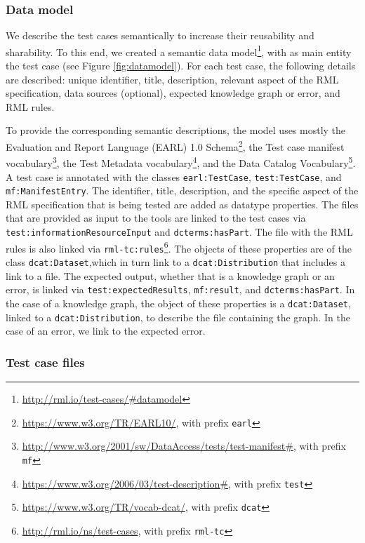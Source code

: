 \subsubsection{Data model}

We describe the test cases semantically to increase their reusability and sharability. To this end, we created a semantic data model\footnote{\url{http://rml.io/test-cases/\#datamodel}}, with as main entity the test case (see Figure \ref{fig:datamodel}). For each test case, the following details are described: unique identifier, title, description, relevant aspect of the RML specification, data sources (optional), expected knowledge graph or error, and RML rules.

To provide the corresponding semantic descriptions, the model uses mostly the Evaluation and Report Language (EARL) 1.0 Schema\footnote{\url{https://www.w3.org/TR/EARL10/}, with prefix \texttt{earl}}, the Test case manifest vocabulary\footnote{\url{http://www.w3.org/2001/sw/DataAccess/tests/test-manifest\#}, with prefix \texttt{mf}}, the Test Metadata vocabulary\footnote{\url{https://www.w3.org/2006/03/test-description\#}, with prefix \texttt{test}}, and the Data Catalog Vocabulary\footnote{\url{https://www.w3.org/TR/vocab-dcat/}, with prefix \texttt{dcat}}. A test case is annotated with the classes \verb|earl:TestCase|, \verb|test:TestCase|, and \verb|mf:ManifestEntry|. The identifier, title, description, and the specific aspect of the RML specification that is being tested are added as datatype properties. The files that are provided as input to the tools are linked to the test cases via \verb|test:informationResourceInput| and \verb|dcterms:hasPart|. The file with the RML rules is also linked via \verb|rml-tc:rules|\footnote{\url{http://rml.io/ns/test-cases}, with prefix \texttt{rml-tc}}. The objects of these properties are of the class \verb|dcat:Dataset|,which in turn link to a \verb|dcat:Distribution| that includes a link to a file. The expected output, whether that is a knowledge graph or an error, is linked via \verb|test:expectedResults|, \verb|mf:result|, and \verb|dcterms:hasPart|. In the case of a knowledge graph, the object of these properties is a \verb|dcat:Dataset|, linked to a \verb|dcat:Distribution|, to describe the file containing the graph. In the case of an error, we link to the expected error.

\subsubsection{Test case files}

